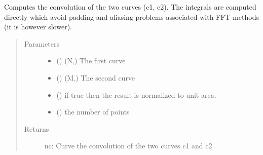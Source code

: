 \documentclass[letterpaper,10pt,english]{sphinxmanual}
\begin{document}

\begin{fulllineitems}
\label{\detokenize{pydv:pydvpy.convolve_int}}
Computes the convolution of the two curves (c1, c2). The integrals are computed directly which avoid padding
and aliasing problems associated with FFT methods (it is however slower).
\begin{quote}\begin{description}
\item[{Parameters}] \leavevmode\begin{itemize}
\item {} 
 ({\hyperref[\detokenize{pydv:curve.Curve}]{}}) \textendash{} (N,) The first curve

\item {} 
 ({\hyperref[\detokenize{pydv:curve.Curve}]{}}) \textendash{} (M,) The second curve

\item {} 
 () \textendash{} if true then the result is normalized to unit area.

\item {} 
 () \textendash{} the number of points

\end{itemize}

\item[{Returns}] \leavevmode
nc: Curve \textendash{} the convolution of the two curves c1 and c2

\end{description}\end{quote}

\end{fulllineitems}

\end{document}
